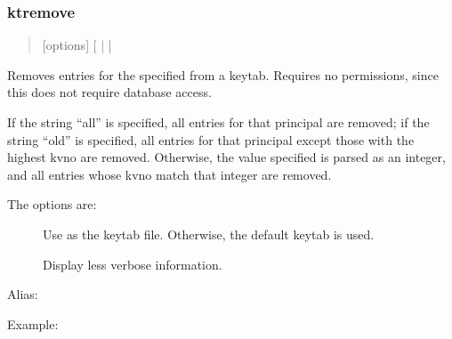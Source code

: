 \documentclass[letterpaper,10pt,english]{sphinxmanual}
\begin{document}
\subsubsection{ktremove}
\label{\detokenize{admin/admin_commands/kadmin_local:ktremove}}\label{\detokenize{admin/admin_commands/kadmin_local:id18}}\begin{quote}

\sphinxAtStartPar
{} {[}options{]}  {[} |  | \sphinxstyleemphasis{old}{]}
\end{quote}

\sphinxAtStartPar
Removes entries for the specified  from a keytab.  Requires
no permissions, since this does not require database access.

\sphinxAtStartPar
If the string “all” is specified, all entries for that principal are
removed; if the string “old” is specified, all entries for that
principal except those with the highest kvno are removed.  Otherwise,
the value specified is parsed as an integer, and all entries whose
kvno match that integer are removed.

\sphinxAtStartPar
The options are:
\begin{description}
\item[{ }] \leavevmode
\sphinxAtStartPar
Use  as the keytab file.  Otherwise, the default keytab is
used.

\item[{}] \leavevmode
\sphinxAtStartPar
Display less verbose information.

\end{description}

\sphinxAtStartPar
Alias: 

\sphinxAtStartPar
Example:

\begin{sphinxVerbatim}[commandchars=\\\{\}]
   
         
\end{sphinxVerbatim}
\end{document}
